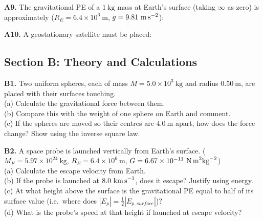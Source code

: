 \begin{exercisebox}[8]
\vspace{0.4cm}

\textbf{A9.} The gravitational PE of a $1\ \text{kg}$
mass at Earth's surface (taking $\infty$ as zero) is
approximately ($R_E = 6.4\times10^6\ \text{m}$,
$g = 9.81\ \text{m\,s}^{-2}$):


\vspace{0.4cm}

\textbf{A10.} A geostationary satellite must be
placed:


\vspace{0.6cm}

\subsection*{Section B: Theory and Calculations}

\textbf{B1.} Two uniform spheres, each of mass
$M = 5.0\times10^3\ \text{kg}$ and radius
$0.50\ \text{m}$, are placed with their surfaces
touching.\\[4pt]
(a) Calculate the gravitational force between them.\\
(b) Compare this with the weight of one sphere
on Earth and comment.\\
(c) If the spheres are moved so their centres are
$4.0\ \text{m}$ apart, how does the force change?
Show using the inverse square law.
\hfill{}

\vspace{0.4cm}

\textbf{B2.} A space probe is launched vertically
from Earth's surface.
($M_E = 5.97\times10^{24}\ \text{kg}$,
$R_E = 6.4\times10^6\ \text{m}$,
$G = 6.67\times10^{-11}\ \text{N\,m}^2\text{kg}^{-2}$)\\[4pt]
(a) Calculate the escape velocity from Earth.\\
(b) If the probe is launched at $8.0\ \text{km\,s}^{-1}$,
does it escape? Justify using energy.\\
(c) At what height above the surface is the
gravitational PE equal to half of its surface value
(i.e.\ where does $|E_p| = \frac{1}{2}|E_{p,surface}|$)?\\
(d) What is the probe's speed at that height if
launched at escape velocity?
\hfill{}


\end{exercisebox}
